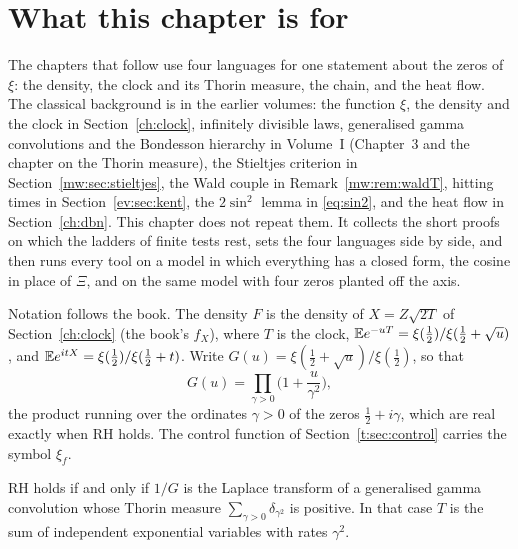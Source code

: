 \label{ch:cosine}\label{ch:tools}

\section{What this chapter is for}\label{t:sec:purpose}

The chapters that follow use four languages for one statement about the zeros of $\xi$: the density, the clock and its Thorin measure, the chain, and the heat flow. The classical background is in the earlier volumes: the function $\xi$, the density and the clock in Section~\ref{ch:clock}, infinitely divisible laws, generalised gamma convolutions and the Bondesson hierarchy in Volume~I (Chapter~3 and the chapter on the Thorin measure), the Stieltjes criterion in Section~\ref{mw:sec:stieltjes}, the Wald couple in Remark~\ref{mw:rem:waldT}, hitting times in Section~\ref{ev:sec:kent}, the $2\sin^2$ lemma in \eqref{eq:sin2}, and the heat flow in Section~\ref{ch:dbn}. This chapter does not repeat them. It collects the short proofs on which the ladders of finite tests rest, sets the four languages side by side, and then runs every tool on a model in which everything has a closed form, the cosine in place of $\Xi$, and on the same model with four zeros planted off the axis.

Notation follows the book. The density $F$ is the density of $X=Z\sqrt{2T}$ of Section~\ref{ch:clock} (the book's $f_X$), where $T$ is the clock, $\mathbb{E} e^{-uT}=\xi(\frac12)/\xi(\frac12+\sqrt u)$, and $\mathbb{E} e^{itX}=\xi(\frac12)/\xi(\frac12+t)$. Write $G(u)=\xi(\frac12+\sqrt u)/\xi(\frac12)$, so that
\begin{equation}\label{t:eq:G}
G(u)=\prod_{\gamma>0}\Big(1+\frac u{\gamma^2}\Big),
\end{equation}
the product running over the ordinates $\gamma>0$ of the zeros $\frac12+i\gamma$, which are real exactly when RH holds. The control function of Section~\ref{t:sec:control} carries the symbol $\xi_f$.

\begin{proposition}\label{t:prop:ggc}
RH holds if and only if $1/G$ is the Laplace transform of a generalised gamma convolution whose Thorin measure $\sum_{\gamma>0}\delta_{\gamma^2}$ is positive. In that case $T$ is the sum of independent exponential variables with rates $\gamma^2$.
\end{proposition}

